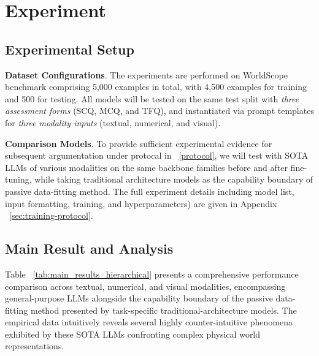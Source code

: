 \vspace{-2mm}

\section{Experiment}
\label{sec:experiment}
\subsection{Experimental Setup}
\textbf{Dataset Configurations}. The experiments are performed on WorldScope benchmark comprising 5,000 examples in total, with 4,500 examples for training and 500 for testing. All models will be tested on the same test split with \emph{three assessment forms} (SCQ, MCQ, and TFQ), and instantiated via prompt templates for \emph{three modality inputs} (textual, numerical, and visual).

\textbf{Comparison Models}. To provide sufficient experimental evidence for subsequent argumentation under protocal in ~\ref{protocol}, we will test with SOTA LLMs of various modalities on the same backbone families before and after fine-tuning, while taking traditional architecture models as the capability boundary of passive data-fitting method. The full experiment details including model list, input formatting, training, and hyperparameters) are given in Appendix ~\ref{sec:training-protocol}.


\subsection{Main Result and Analysis}
\label{phenomenon}

Table ~\ref{tab:main_results_hierarchical} presents a comprehensive performance comparison across textual, numerical, and visual modalities, encompassing general-purpose LLMs alongside the capability boundary of the passive data-fitting method presented by task-specific traditional-architecture models. The empirical data intuitively reveals several highly counter-intuitive phenomena exhibited by these SOTA LLMs confronting complex physical world representations.

